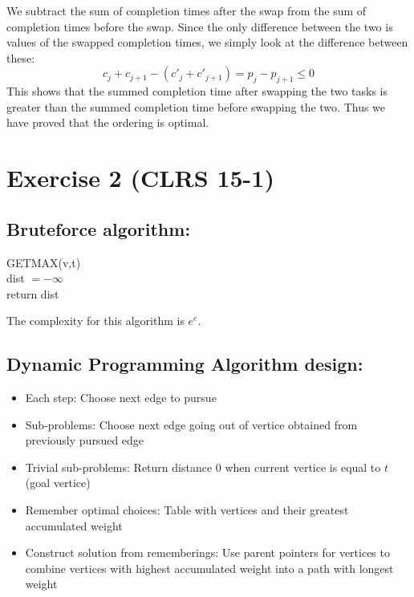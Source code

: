 We subtract the sum of completion times after the swap from the sum of completion times before the swap.
Since the only difference between the two is values of the swapped completion times, we simply look at the difference between these:
$$c_j + c_{j+1} - (c'_j + c'_{j+1})= p_j - p_{j + 1} \leq 0$$
This shows that the summed completion time after swapping the two tasks is greater than the summed completion time before swapping the two.
Thus we have proved that the ordering is optimal.

\section*{Exercise 2 (CLRS 15-1)}

\subsection*{Bruteforce algorithm:}

\begin{algorithm}[H]
GETMAX(v,t)
\\
dist $= -\infty$\\
return dist
\end{algorithm}
The complexity for this algorithm is $e^e$.

\subsection*{Dynamic Programming Algorithm design:}

\begin{itemize}
\item{Each step: Choose next edge to pursue}
\item{Sub-problems: Choose next edge going out of vertice obtained from previously pursued edge}
\item{Trivial sub-problems: Return distance 0 when current vertice is equal to $t$ (goal vertice)}
\item{Remember optimal choices: Table with vertices and their greatest accumulated weight}
\item{Construct solution from rememberings: Use parent pointers for vertices to combine vertices with highest accumulated weight into a path with longest weight}
\end{itemize}


